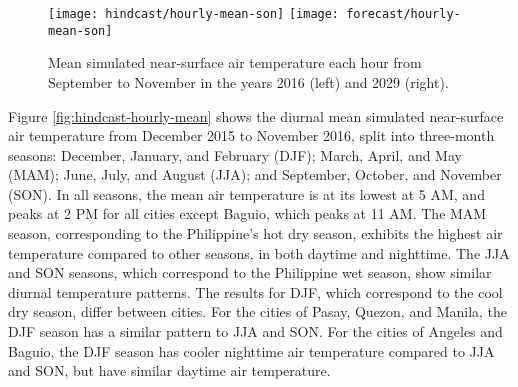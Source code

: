 	\begin{figure}	
		\centering
		\texttt{[image: hindcast/hourly-mean-son]}		
		\texttt{[image: forecast/hourly-mean-son]}		
		\caption{
			Mean simulated near-surface air temperature each hour from September to November in the years 2016 (left) and 2029 (right).
		}
		\label{fig:hourly-mean-son}
	\end{figure}

	Figure \ref{fig:hindcast-hourly-mean} shows the diurnal mean simulated near-surface air temperature from December 2015 to November 2016, split into three-month seasons:
		December, January, and February (DJF);
		March, April, and May (MAM);
		June, July, and August (JJA);
		and
		September, October, and November (SON).
	In all seasons, the mean air temperature is at its lowest at 5 AM, and peaks at 2 PM for all cities except Baguio, which peaks at 11 AM.
	The MAM season, corresponding to the Philippine's hot dry season, exhibits the highest air temperature compared to other seasons, in both daytime and nighttime.
	The JJA and SON seasons, which correspond to the Philippine wet season, show similar diurnal temperature patterns.
	The results for DJF, which correspond to the cool dry season, differ between cities.
	For the cities of Pasay, Quezon, and Manila, the DJF season has a similar pattern to JJA and SON.
	For the cities of Angeles and Baguio, the DJF season has cooler nighttime air temperature compared to JJA and SON, but have similar daytime air temperature.
	
